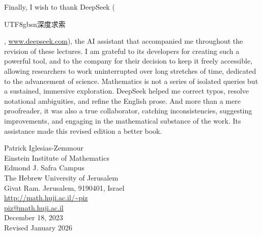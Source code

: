 \medskip\noindent
Finally,
I wish to thank DeepSeek (\begin{CJK}{UTF8}{gbsn}深度求索\end{CJK}, \url{www.deepseek.com}),
the AI assistant that accompanied me throughout the revision of these lectures.
I am grateful to its developers for creating such a powerful tool,
and to the company for their decision to keep it freely accessible,
allowing researchers to work uninterrupted over long stretches of time,
dedicated to the advancement of science.
Mathematics is not a series of isolated queries but a sustained,
immersive exploration.
DeepSeek helped me correct typos,
resolve notational ambiguities,
and refine the English prose.
And more than a mere proofreader,
it was also a true collaborator,
catching inconsistencies,
suggesting improvements,
and engaging in the mathematical substance of the work.
Its assistance made this revised edition a better book.

\vfill
\begin{flushright}
  Patrick Iglesias-Zemmour\\
  Einstein Institute of Mathematics \\
  Edmond J. Safra Campus \\
  The Hebrew University of Jerusalem \\
  Givat Ram. Jerusalem, 9190401, Israel \\
  \medskip
  \url{http://math.huji.ac.il/~piz}\\
  \url{piz@math.huji.ac.il}\\
  \medskip
  \hfill December 18, 2023 \\
  \hfill Revised January 2026
\end{flushright}
